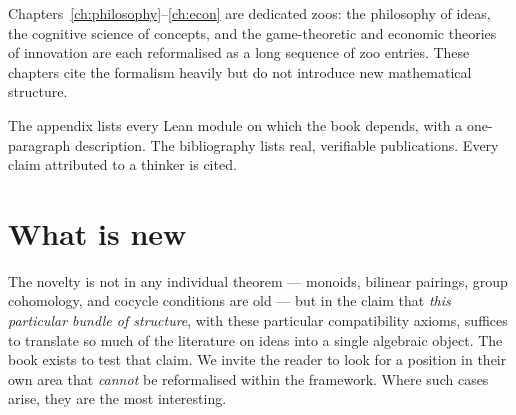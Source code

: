 Chapters~\ref{ch:philosophy}--\ref{ch:econ} are dedicated zoos: the
philosophy of ideas, the cognitive science of concepts, and the
game-theoretic and economic theories of innovation are each reformalised
as a long sequence of zoo entries. These chapters cite the formalism
heavily but do not introduce new mathematical structure.

The appendix lists every Lean module on which the book depends, with a
one-paragraph description. The bibliography lists real, verifiable
publications. Every claim attributed to a thinker is cited.

\section*{What is new}

The novelty is not in any individual theorem --- monoids, bilinear pairings,
group cohomology, and cocycle conditions are old --- but in the claim that
\emph{this particular bundle of structure}, with these particular
compatibility axioms, suffices to translate so much of the literature on
ideas into a single algebraic object. The book exists to test that claim.
We invite the reader to look for a position in their own area that
\emph{cannot} be reformalised within the framework. Where such cases
arise, they are the most interesting.
